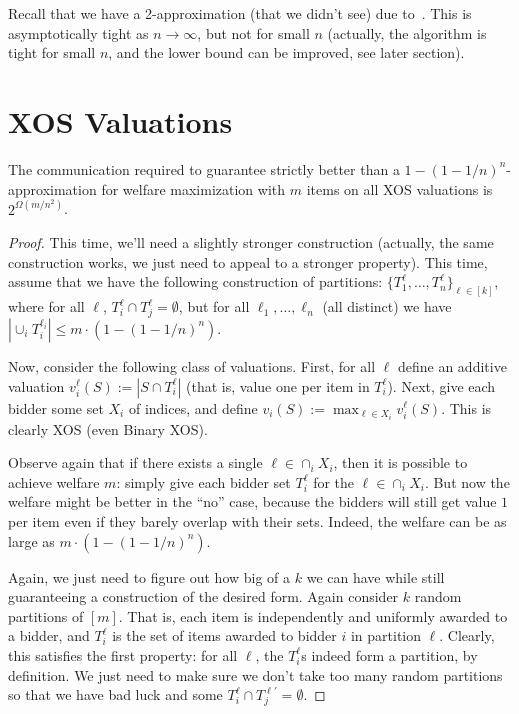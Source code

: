 Recall that we have a 2-approximation (that we didn't see) due to~\cite{Feige06}. This is asymptotically tight as $n\rightarrow \infty$, but not for small $n$ (actually, the algorithm is tight for small $n$, and the lower bound can be improved, see later section). 

\section{XOS Valuations}
\begin{theorem}The communication required to guarantee strictly better than a $1-(1-1/n)^n$-approximation for welfare maximization with $m$ items on all XOS valuations is $2^{\Omega(m/n^2)}$.
\end{theorem}

\begin{proof}
This time, we'll need a slightly stronger construction (actually, the same construction works, we just need to appeal to a stronger property). This time, assume that we have the following construction of partitions: $\{T_1^\ell,\ldots, T_n^\ell\}_{\ell \in [k]}$, where for all $\ell$, $T_i^\ell \cap T_j^\ell = \emptyset$, but for all $\ell_1,\ldots, \ell_n$ (all distinct) we have $|\cup_i T_i^{\ell_i}| \leq m\cdot (1-(1-1/n)^n)$. 

Now, consider the following class of valuations. First, for all $\ell$ define an additive valuation $v_i^\ell(S) := |S \cap T_i^\ell|$ (that is, value one per item in $T_i^\ell$). Next, give each bidder some set $X_i$ of indices, and define $v_i(S) := \max_{\ell \in X_i} v_i^\ell(S)$. This is clearly XOS (even Binary XOS). 

Observe again that if there exists a single $\ell \in \cap_i X_i$, then it is possible to achieve welfare $m$: simply give each bidder set $T_i^\ell$ for the $\ell \in \cap_i X_i$. But now the welfare might be better in the ``no'' case, because the bidders will still get value $1$ per item even if they barely overlap with their sets. Indeed, the welfare can be as large as $m \cdot (1-(1-1/n)^n)$.

Again, we just need to figure out how big of a $k$ we can have while still guaranteeing a construction of the desired form. Again consider $k$ random partitions of $[m]$. That is, each item is independently and uniformly awarded to a bidder, and $T_i^\ell$ is the set of items awarded to bidder $i$ in partition $\ell$. Clearly, this satisfies the first property: for all $\ell$, the $T_i^\ell$s indeed form a partition, by definition. We just need to make sure we don't take too many random partitions so that we have bad luck and some $T_i^\ell \cap T_j^{\ell'}= \emptyset$. 


\end{proof}
